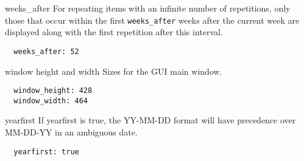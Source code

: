 \documentclass[9pt,landscape]{article}
\begin{document}
\begin{multicols}{3}
\begin{compactdesc}
\item[weeks\_after] For repeating items with an infinite number of repetitions, only those that occur within the first \verb'weeks_after' weeks after the current week are displayed along with the first repetition after this interval.
\begin{verbatim}
  weeks_after: 52
\end{verbatim}

\item[window height and width] Sizes for the GUI main window.
\begin{verbatim}
  window_height: 428
  window_width: 464
\end{verbatim}

\item[yearfirst] If yearfirst is true, the YY-MM-DD format will have precedence over MM-DD-YY in an ambiguous date.
\begin{verbatim}
  yearfirst: true
\end{verbatim}

\end{compactdesc}

\end{multicols}
\end{document}
